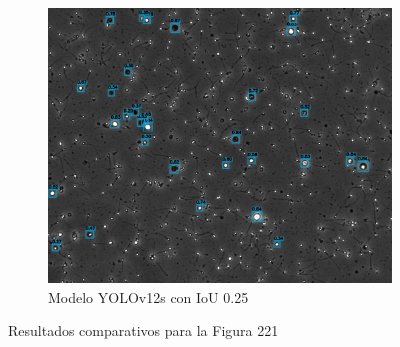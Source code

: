 \documentclass[12pt,a4paper,onecolumn,oneside]{report}
\begin{document}
\begin{figure}[H]
  \vspace{0.3cm}
  \begin{subfigure}[b]{0.48\textwidth}
    \centering
    \includegraphics[width=\textwidth]{figuras/evaluacion_cualitativa/221/221_v12_IoU0.25.jpg}
    \caption{Modelo YOLOv12s con IoU 0.25}
    \label{figyolov12s_IoU0.25_image_221}
  \end{subfigure}
  
  \caption{Resultados comparativos para la Figura 221}
  \label{fig:221}
\end{figure}
\end{document}

